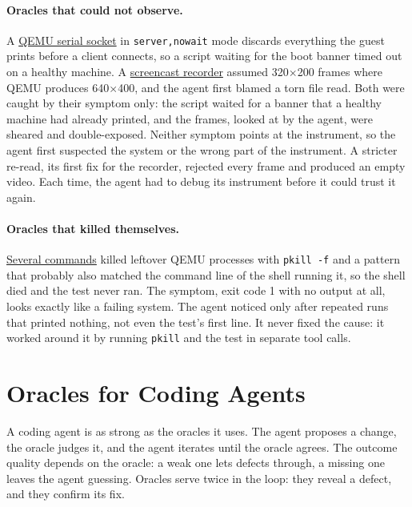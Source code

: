 \documentclass{article}
\newcommand{\defect}[2]{\href{\siteurl/defects.html\##1}{#2}}
\begin{document}
\paragraph{Oracles that could not observe.} A \defect{D-C09-03}{QEMU serial socket} in
\texttt{server,nowait} mode discards everything the guest prints before a client
connects, so a script waiting for the boot banner timed out on a healthy machine. A
\defect{D-C10-06}{screencast recorder} assumed 320$\times$200 frames where QEMU produces 640$\times$400, and
the agent first blamed a torn file read. Both were caught by their symptom only: the
script waited for a banner that a healthy machine had already printed, and the frames,
looked at by the agent, were sheared and double-exposed. Neither symptom points at the
instrument, so the agent first suspected the system or the wrong part of the
instrument. A stricter re-read, its first fix for the recorder, rejected every frame and
produced an empty video. Each time, the agent had to debug its instrument before it could
trust it again.

\paragraph{Oracles that killed themselves.} \defect{D-C10-05}{Several commands} killed
leftover QEMU processes with \texttt{pkill -f} and a pattern that probably also matched the
command line of the shell running it, so the shell died and the test never ran. The
symptom, exit code 1 with no output at all, looks exactly like a failing system. The agent
noticed only after repeated runs that printed nothing, not even the test's first line.
It never fixed the cause: it worked around it by running \texttt{pkill} and the test in
separate tool calls.


\clearpage
\section{Oracles for Coding Agents}\label{sec:oracles}



A coding agent is as strong as the oracles it uses. The agent proposes a change, the oracle
judges it, and the agent iterates until the oracle agrees. The outcome quality depends on the oracle: a weak one lets defects through, a missing
one leaves the agent guessing.
Oracles
serve twice in the loop: they reveal a defect, and they confirm its fix.
\end{document}

